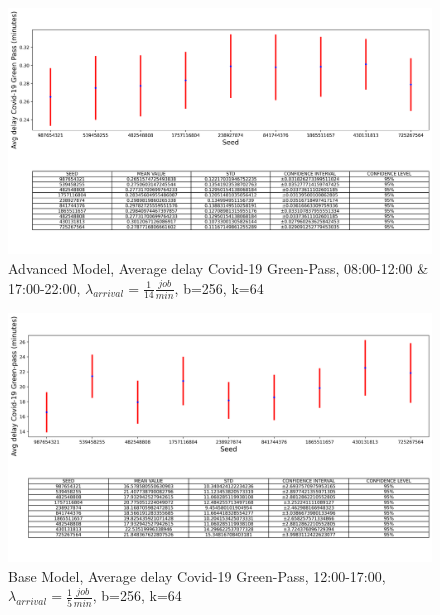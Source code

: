 \documentclass{article}
\begin{document}
\begin{figure}[H]
	\centering
	\captionsetup{justification=centering,margin=2cm}
	\includegraphics[scale=0.48]{images/adv_avg_d_covid_steady_state_mor.png}
	\caption{Advanced Model, Average delay Covid-19 Green-Pass, 08:00-12:00 \& 17:00-22:00, $\lambda_{arrival}=\frac{1}{14} \frac{job}{min}$, b=256, k=64}\label{figura:adv_avg_d_covid_steady_state_mor}
\end{figure}

\begin{figure}[H]
	\centering
	\captionsetup{justification=centering,margin=2cm}
	\includegraphics[scale=0.48]{images/avg_d_covid_steady_state_aft.png}
	\caption{Base Model, Average delay Covid-19 Green-Pass, 12:00-17:00, $\lambda_{arrival}=\frac{1}{5} \frac{job}{min}$, b=256, k=64}\label{figura:avg_d_covid_steady_state_aft}
\end{figure}
\end{document}
